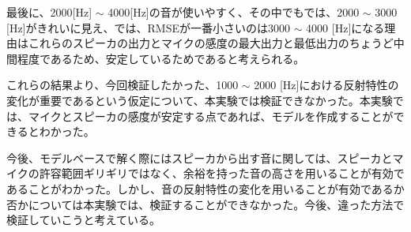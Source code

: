 最後に、2000[Hz] $\sim$ 4000[Hz]の音が使いやすく、その中でもでは、2000 $\sim$ 3000 [Hz]がきれいに見え、では、RMSEが一番小さいのは3000 $\sim$ 4000 [Hz]になる理由はこれらのスピーカの出力とマイクの感度の最大出力と最低出力のちょうど中間程度であるため、安定しているためであると考えられる。

これらの結果より、今回検証したかった、1000 $\sim$ 2000 [Hz]における反射特性の変化が重要であるという仮定について、本実験では検証できなかった。本実験では、マイクとスピーカの感度が安定する点であれば、モデルを作成することができるとわかった。

今後、モデルベースで解く際にはスピーカから出す音に関しては、スピーカとマイクの許容範囲ギリギリではなく、余裕を持った音の高さを用いることが有効であることがわかった。しかし、音の反射特性の変化を用いることが有効であるか否かについては本実験では、検証することができなかった。今後、違った方法で検証していこうと考えている。

